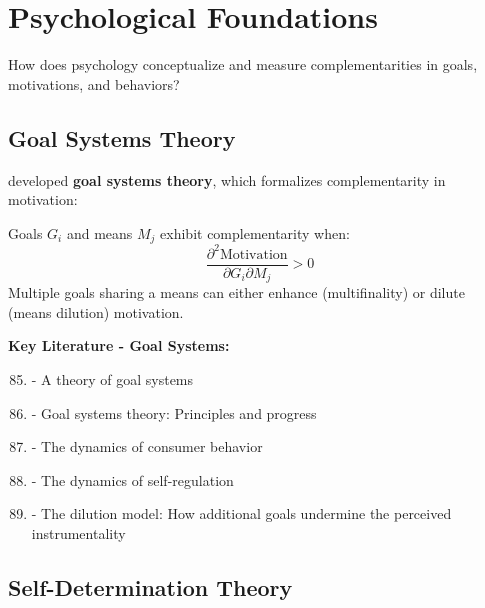 \section{Psychological Foundations}
\label{sec:psychology}

\begin{tcolorbox}[colback=purple!5!white,colframe=purple!75!black,title=\textbf{Fundamental Question}]
How does psychology conceptualize and measure complementarities in goals, motivations, and behaviors?
\end{tcolorbox}

\subsection{Goal Systems Theory}
\label{subsec:goal-systems}

\citet{kruglanski2002} developed \textbf{goal systems theory}, which formalizes complementarity in motivation:

\begin{definition}
Goals $G_i$ and means $M_j$ exhibit complementarity when:
\begin{equation}
\frac{\partial^2 \text{Motivation}}{\partial G_i \partial M_j} > 0
\end{equation}
Multiple goals sharing a means can either enhance (multifinality) or dilute (means dilution) motivation.
\end{definition}

\textbf{Key Literature - Goal Systems:}
\begin{enumerate}[noitemsep]
    \setcounter{enumi}{84}
    \item \citet{kruglanski2002} - A theory of goal systems
    \item \citet{kruglanski2013} - Goal systems theory: Principles and progress
    \item \citet{kopetz2012} - The dynamics of consumer behavior
    \item \citet{fishbach2006} - The dynamics of self-regulation
    \item \citet{zhang2007} - The dilution model: How additional goals undermine the perceived instrumentality
\end{enumerate}

\subsection{Self-Determination Theory}
\label{subsec:sdt}

